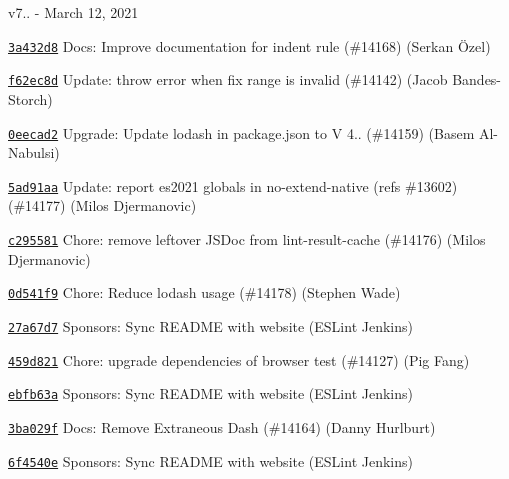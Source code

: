 v7.. -\/ March 12, 2021


\begin{DoxyItemize}
\item \href{https://github.com/eslint/eslint/commit/3a432d82b3a5710aff7da20302fe0b94fedc46c2}{\texttt{ {\ttfamily 3a432d8}}} Docs\+: Improve documentation for indent rule (\#14168) (Serkan Özel)
\item \href{https://github.com/eslint/eslint/commit/f62ec8d30d925e70e4d0d40640857c587ac2e116}{\texttt{ {\ttfamily f62ec8d}}} Update\+: throw error when fix range is invalid (\#14142) (Jacob Bandes-\/\+Storch)
\item \href{https://github.com/eslint/eslint/commit/0eecad271358f753730741fcfcb2f7cc915c1fa7}{\texttt{ {\ttfamily 0eecad2}}} Upgrade\+: Update lodash in package.\+json to V 4.. (\#14159) (Basem Al-\/\+Nabulsi)
\item \href{https://github.com/eslint/eslint/commit/5ad91aa7df3d6bc185786e6eccd9e055fd951055}{\texttt{ {\ttfamily 5ad91aa}}} Update\+: report es2021 globals in no-\/extend-\/native (refs \#13602) (\#14177) (Milos Djermanovic)
\item \href{https://github.com/eslint/eslint/commit/c295581aca4e08ec4ae8e5ee5726a6f454a3ee26}{\texttt{ {\ttfamily c295581}}} Chore\+: remove leftover JSDoc from lint-\/result-\/cache (\#14176) (Milos Djermanovic)
\item \href{https://github.com/eslint/eslint/commit/0d541f9d9d58966372e2055a8f69fb9483d56a4b}{\texttt{ {\ttfamily 0d541f9}}} Chore\+: Reduce lodash usage (\#14178) (Stephen Wade)
\item \href{https://github.com/eslint/eslint/commit/27a67d71ffa9bbd7af02ae448844e127bcf956dc}{\texttt{ {\ttfamily 27a67d7}}} Sponsors\+: Sync README with website (ESLint Jenkins)
\item \href{https://github.com/eslint/eslint/commit/459d821f4a599501ceb002f9d7a5034fc45ffbb0}{\texttt{ {\ttfamily 459d821}}} Chore\+: upgrade dependencies of browser test (\#14127) (Pig Fang)
\item \href{https://github.com/eslint/eslint/commit/ebfb63a682004a008f2707dbad616e5ae1630b2c}{\texttt{ {\ttfamily ebfb63a}}} Sponsors\+: Sync README with website (ESLint Jenkins)
\item \href{https://github.com/eslint/eslint/commit/3ba029fbffd44068be93254890fc2aec3e92c212}{\texttt{ {\ttfamily 3ba029f}}} Docs\+: Remove Extraneous Dash (\#14164) (Danny Hurlburt)
\item \href{https://github.com/eslint/eslint/commit/6f4540ea7ea39775906526506fd7abd7ea97610c}{\texttt{ {\ttfamily 6f4540e}}} Sponsors\+: Sync README with website (ESLint Jenkins)

\end{DoxyItemize}

